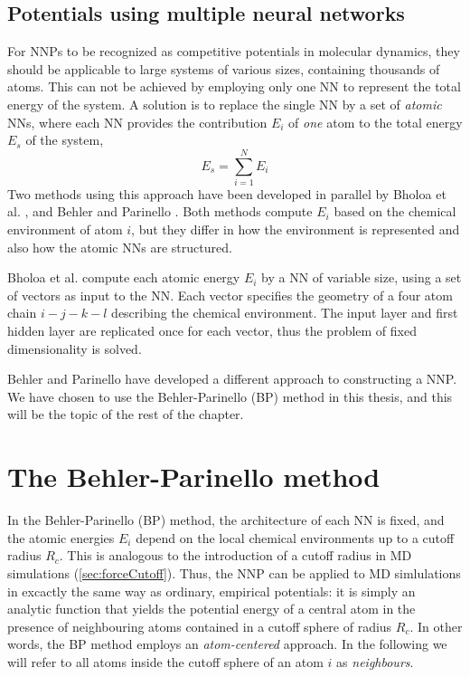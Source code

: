 \documentclass[twoside,english]{uiofysmaster}
\begin{document}
\subsection{Potentials using multiple neural networks}
For NNPs to be recognized as competitive potentials in molecular dynamics, they should be applicable to large systems
of various sizes, containing thousands of atoms. This can not be achieved by employing only one NN to 
represent the total energy of the system. A solution is to replace the single NN by a set of \textit{atomic} NNs, where 
each NN provides the contribution $E_i$ of \textit{one} atom to the total energy $E_s$ of the system, 
\begin{equation}
 E_s = \sum_{i=1}^N E_i
 \label{systemEnergy}
\end{equation}
Two methods using this approach have been developed in parallel by Bholoa et al. \cite{Bholoa07}, and Behler and Parinello 
\cite{Behler07}.
Both methods compute $E_i$ based on the chemical environment of atom $i$, but they differ in how 
the environment is represented and also how the atomic NNs are structured. 

Bholoa et al. compute each atomic energy $E_i$ by a NN of variable size, using a set of 
vectors as input to the NN. Each vector specifies the geometry of a four atom chain $i-j-k-l$ describing the chemical 
environment. The input layer and first hidden layer are replicated once for each vector, thus the problem 
of fixed dimensionality is solved. 

Behler and Parinello have developed a different approach to constructing a NNP. 
We have chosen to use the Behler-Parinello (BP) method in this thesis, and this will be the topic of the 
rest of the chapter. 

\section{The Behler-Parinello method}
In the Behler-Parinello (BP) method, the architecture of each NN is fixed, and
the atomic energies $E_i$ depend on the local chemical environments up to a cutoff radius $R_c$. 
This is analogous to the introduction of a cutoff radius in MD simulations
(\autoref{sec:forceCutoff}). Thus, the NNP can be applied to MD simlulations in excactly the same way 
as ordinary, empirical potentials: it is simply an analytic function that yields the potential energy of a central atom
in the presence of neighbouring atoms contained in a cutoff sphere of radius $R_c$. 
In other words, the BP method employs an \textit{atom-centered} approach. 
In the following we will refer to all atoms inside the cutoff sphere of an atom $i$ as \textit{neighbours}.
\end{document}
